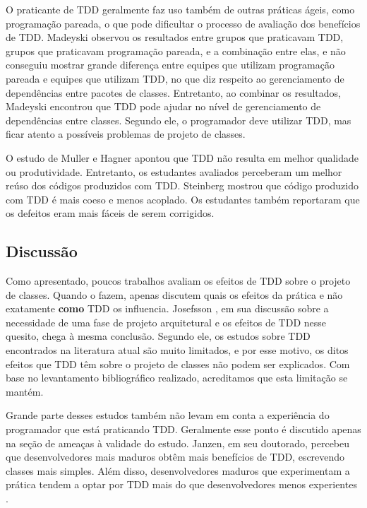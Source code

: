 \documentclass[conference]{IEEEtran}
\begin{document}
O praticante de TDD geralmente faz uso também de outras práticas ágeis, como
programação pareada, o que pode dificultar o processo de avaliação dos benefícios
de TDD. Madeyski \cite{madeyski-package-dependencies} observou os resultados
entre grupos que praticavam TDD, grupos que praticavam programação pareada, 
e a combinação entre elas,
e não conseguiu mostrar grande diferença entre equipes que utilizam programação 
pareada e equipes que utilizam TDD, no que diz respeito ao gerenciamento de dependências entre 
pacotes de classes. Entretanto, ao combinar os resultados, Madeyski encontrou que TDD pode 
ajudar no nível de gerenciamento de dependências entre classes. Segundo ele, o 
programador deve utilizar TDD, mas ficar atento a possíveis problemas de projeto de classes.

O estudo de Muller e Hagner \cite{muller-e-hagner} apontou que TDD não resulta
em melhor qualidade ou produtividade. Entretanto, os estudantes avaliados perceberam um 
melhor reúso dos códigos produzidos com TDD. Steinberg \cite{steinberg} mostrou
que código produzido com TDD é mais coeso e menos acoplado. Os estudantes também
reportaram que os defeitos eram mais fáceis de serem corrigidos. 

\subsection{Discussão}

Como apresentado, poucos trabalhos avaliam os efeitos de TDD sobre o
projeto de classes. Quando o fazem, apenas discutem quais os efeitos da prática
e não exatamente \textbf{como} TDD os influencia. Josefsson
\cite{josefsson}, em sua discussão sobre a necessidade de uma fase de projeto
arquitetural e os efeitos de TDD nesse quesito, chega à mesma conclusão. Segundo
ele, os estudos sobre TDD encontrados na literatura atual são muito limitados, e
por esse motivo, os ditos efeitos que TDD têm 
sobre o projeto de classes não podem ser explicados. Com base no levantamento
bibliográfico realizado, acreditamos que esta limitação se mantém.

Grande parte desses estudos também não levam em conta a experiência do
programador que está praticando TDD. Geralmente esse ponto é discutido apenas 
na seção de ameaças à validade do estudo. Janzen, em seu doutorado, percebeu que
desenvolvedores mais maduros obtêm mais benefícios de TDD, escrevendo classes
mais simples. Além disso, desenvolvedores maduros que experimentam a prática
tendem a optar por TDD mais do que desenvolvedores menos experientes
\cite{janzen-phd}.
\end{document}
